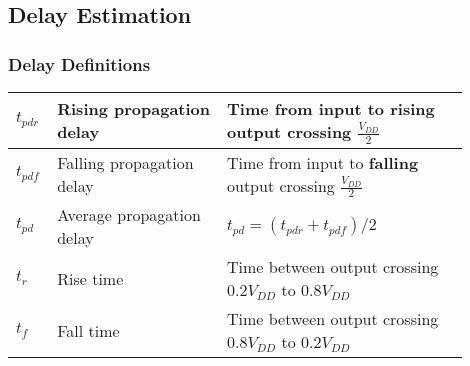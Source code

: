 \subsection{Delay Estimation}
    \subsubsection{Delay Definitions}
    \begin{tabular}{| p{0.05\linewidth} | p{0.35\linewidth} | p{0.5\linewidth} |}
        \hline
        $t_{pdr}$ & Rising propagation delay & Time from input to \textbf{rising} output crossing $\frac{V_{DD}}{2}$\\
        \hline
        $t_{pdf}$ & Falling propagation delay & Time from input to \textbf{falling} output crossing $\frac{V_{DD}}{2}$\\
        \hline
        $t_{pd}$ & Average propagation delay & $t_{pd} = (t_{pdr} + t_{pdf})/2$\\
        \hline
        $t_{r}$ & Rise time & Time between output crossing $0.2V_{DD}$ to $0.8V_{DD}$\\
        \hline
        $t_{f}$ & Fall time & Time between output crossing $0.8V_{DD}$ to $0.2V_{DD}$\\
        \hline
    \end{tabular}